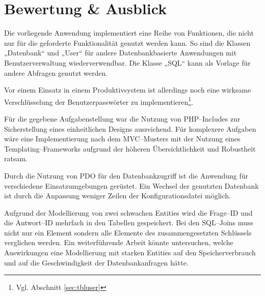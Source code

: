 \section{Bewertung \& Ausblick}

Die vorliegende Anwendung implementiert eine Reihe von Funktionen, die nicht nur für die geforderte Funktionalität genutzt werden kann. So sind die Klassen „Datenbank“ und „User“ für andere Datenbankbasierte Anwendungen mit Benutzerverwaltung wiederverwendbar. Die Klasse „SQL“ kann als Vorlage für andere Abfragen genutzt werden.

Vor einem Einsatz in einem Produktivsystem ist allerdings noch eine wirksame Verschlüsselung der Benutzerpasswörter zu implementieren\footnote{Vgl. Abschnitt \ref{sec:tbluser}}.

Für die gegebene Aufgabenstellung war die Nutzung von PHP--Includes zur Sicherstellung eines einheitlichen Designs ausreichend. Für komplexere Aufgaben wäre eine Implementierung nach dem MVC--Musters mit der Nutzung eines Temp\-lating--Frame\-works aufgrund der höheren Übersichtlichkeit und Robustheit ratsam.

Durch die Nutzung von PDO für den Datenbankzugriff ist die Anwendung für verschiedene Einsatzumgebungen gerüstet. Ein Wechsel der genutzten Datenbank ist durch die Anpassung weniger Zeilen der Konfigurationsdatei möglich.

Aufgrund der Modellierung von zwei schwachen Entities wird die Frage--ID und die Antwort--ID mehrfach in den Tabellen gespeichert. Bei den SQL--Joins muss nicht nur ein Element sondern alle Elemente des zusammengesetzten Schlüssels verglichen werden. Ein weiterführende Arbeit könnte untersuchen, welche Auswirkungen eine Modellierung mit starken Entities auf den Speicherverbrauch und auf die Geschwindigkeit der Datenbankanfragen hätte.
